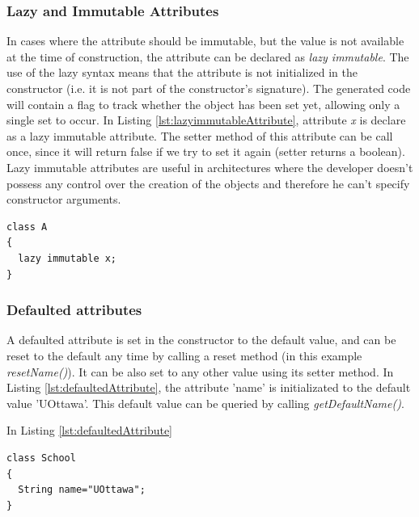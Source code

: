 \subsubsection{Lazy and Immutable Attributes}
In cases where the attribute should be immutable, but the value is not available at the time of construction, the attribute can be declared as \textit{lazy immutable}. The use of the lazy syntax means that the attribute is not initialized in the constructor (i.e. it is not part of the constructor's signature). The generated code will contain a flag to track whether the object has been set yet, allowing only a single set to occur. In Listing \ref{lst:lazyimmutableAttribute},
attribute \textit{x} is declare as a lazy immutable attribute. The setter method of this attribute can be call once, since it will return false if we try to set it again (setter returns a boolean). Lazy immutable attributes are useful in architectures where the developer doesn't possess any control over the creation of the objects and therefore he can't specify constructor arguments.

\begin{lstlisting}[style=umplePlain,label=lst:lazyimmutableAttribute, caption=Lazy immutable Umple attribute]
class A 
{
  lazy immutable x;
}
\end{lstlisting}


\subsubsection{Defaulted attributes}
A defaulted attribute is set in the constructor to the default value, and can be reset to the default any time by calling a reset method (in this example \textit{resetName()}). It can be also set to any other value using its setter method. In Listing \ref{lst:defaultedAttribute}, the attribute 'name' is initializated to the default value 'UOttawa'. This default value can be queried by calling \textit{getDefaultName()}.

In Listing \ref{lst:defaultedAttribute}

\begin{lstlisting}[style=umplePlain,label=lst:defaultedAttribute, caption=Defaulted Umple attribute]
class School 
{
  String name="UOttawa";
}
\end{lstlisting}


